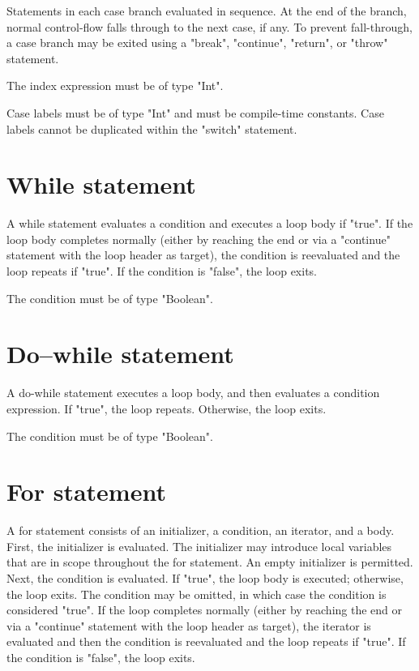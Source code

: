 Statements in each case branch evaluated in sequence.  At the
end of the branch, normal control-flow falls through to the next case, if
any.  To prevent fall-through, a case branch may be exited using a \xcd"break",
\xcd"continue", \xcd"return", or \xcd"throw" statement.

The index expression must be of type \xcd"Int".

Case labels must be of type \xcd"Int" and must be compile-time
constants.  Case labels cannot be duplicated within the
\xcd"switch" statement.

\section{While statement}

A while statement evaluates a condition and executes a loop body
if \xcd"true".  If the loop body completes normally (either by reaching
the end or via a \xcd"continue" statement with the loop header
as target), the condition is reevaluated and the loop repeats if
\xcd"true".  If the condition is \xcd"false", the loop
exits.

The condition must be of type \xcd"Boolean".

\section{Do--while statement}

A do-while statement executes a loop body, and then evaluates a
condition expression.  If \xcd"true", the loop repeats.
Otherwise, the loop exits.

The condition must be of type \xcd"Boolean".

\section{For statement}

A for statement consists of an initializer, a condition, an
iterator, and a body.  First, the initializer is evaluated.
The initializer may introduce local variables that are in scope
throughout the for statement.  An empty initializer is
permitted.
Next, the condition is evaluated.  If \xcd"true", the loop body
is executed; otherwise, the loop exits.
The condition may be omitted, in which case the condition is
considered \xcd"true".
If the loop completes normally (either by reaching the end
or via a \xcd"continue" statement with the loop header as
target),
the iterator is evaluated and then the condition is reevaluated
and the loop repeats if
\xcd"true".  If the condition is \xcd"false", the loop
exits.


